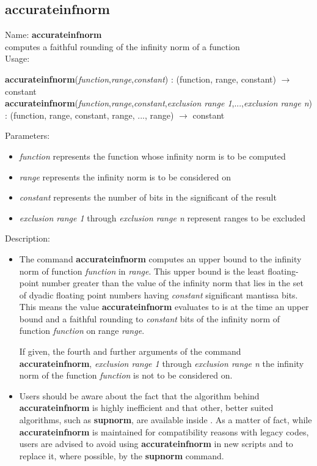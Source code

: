 \subsection{accurateinfnorm}
\label{labaccurateinfnorm}
\noindent Name: \textbf{accurateinfnorm}\\
computes a faithful rounding of the infinity norm of a function \\
\noindent Usage: 
\begin{center}
\textbf{accurateinfnorm}(\emph{function},\emph{range},\emph{constant}) : (\textsf{function}, \textsf{range}, \textsf{constant}) $\rightarrow$ \textsf{constant}\\
\textbf{accurateinfnorm}(\emph{function},\emph{range},\emph{constant},\emph{exclusion range 1},...,\emph{exclusion range n}) : (\textsf{function}, \textsf{range}, \textsf{constant}, \textsf{range}, ..., \textsf{range}) $\rightarrow$ \textsf{constant}\\
\end{center}
Parameters: 
\begin{itemize}
\item \emph{function} represents the function whose infinity norm is to be computed
\item \emph{range} represents the infinity norm is to be considered on
\item \emph{constant} represents the number of bits in the significant of the result
\item \emph{exclusion range 1} through \emph{exclusion range n} represent ranges to be excluded 
\end{itemize}
\noindent Description: \begin{itemize}

\item The command \textbf{accurateinfnorm} computes an upper bound to the infinity norm of
   function \emph{function} in \emph{range}. This upper bound is the least
   floating-point number greater than the value of the infinity norm that
   lies in the set of dyadic floating point numbers having \emph{constant}
   significant mantissa bits. This means the value \textbf{accurateinfnorm} evaluates to
   is at the time an upper bound and a faithful rounding to \emph{constant}
   bits of the infinity norm of function \emph{function} on range \emph{range}.
    
   If given, the fourth and further arguments of the command \textbf{accurateinfnorm},
   \emph{exclusion range 1} through \emph{exclusion range n} the infinity norm of
   the function \emph{function} is not to be considered on.

\item Users should be aware about the fact that the algorithm behind
   \textbf{accurateinfnorm} is highly inefficient and that other, better suited
   algorithms, such as \textbf{supnorm}, are available inside \sollya. As a
   matter of fact, while \textbf{accurateinfnorm} is maintained for compatibility reasons
   with legacy \sollya codes, users are advised to avoid using \textbf{accurateinfnorm}
   in new \sollya scripts and to replace it, where possible, by the
   \textbf{supnorm} command.
\end{itemize}
